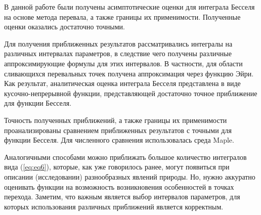 \documentclass[14pt]{extarticle}
\begin{document}
В данной работе были получены асимптотические оценки для интеграла Бесселя на основе метода перевала, а также границы их применимости. Полученные оценки оказались достаточно точными. 

Для получения приближенных результатов рассматривались интегралы на различных интервалах параметров, 
в следствие чего получены различные аппроксимирующие формулы для этих интервалов. В частности, для области сливающихся перевальных точек получена аппроксимация через функцию Эйри. Как результат, аналитическая оценка интеграла Бесселя представлена в виде кусочно-непрерывной функции, представляющей достаточно точное приближение для функции Бесселя.

Точность полученных приближений, а также границы их применимости проанализированы сравнением приближенных результатов с точными для функции Бесселя. Для численного сравнения использовалась среда Maple.

Аналогичными способами можно приближать большое количество интегралов вида (\ref{eq:eq6}), которые, как уже говорилось ранее, могут появиться при описании (исследовании) разнообразных явлений природы. Но, нужно аккуратно оценивать функции на возможность возникновения особенностей в точках перехода. Заметим, что важным является выбор интервалов параметров, для которых использования различных приближений является корректным. 

 
\newpage
\end{document}
